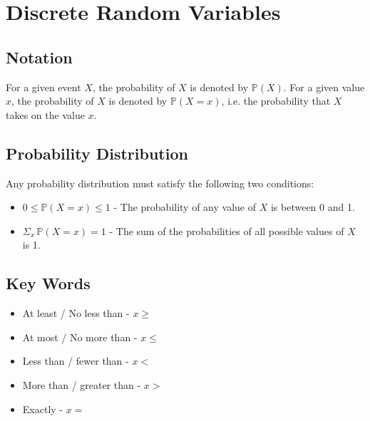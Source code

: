 \documentclass[12pt letter]{report}
\begin{document}



\section{Discrete Random Variables}

\subsection{Notation}

For a given event $X$, the probability of $X$ is denoted by $\mathbb{P} \left( X \right) $. For a given value $x$, the
probability of $X$ is denoted by $\mathbb{P} \left( X = x \right) $, i.e. the probability that $X$ takes on the value $x$.

\subsection{Probability Distribution}


Any probability distribution must satisfy the following two conditions:

\begin{itemize}
	\item $0 \leq \mathbb{P} \left( X = x  \right) \leq 1 $ - The probability of any value of $X$ is between 0 and 1.
	\item $\Sigma_x \,  \mathbb{P} \left( X = x \right) = 1 $ - The sum of the probabilities of all possible values of $X$ is 1.
\end{itemize}

\subsection{Key Words}

\begin{itemize}
	\item At least / No less than - $ x \geq$
	\item At most / No more than - $x \leq$
	\item Less than / fewer than - $ x <$
	\item  More than / greater than - $ x >$
	\item Exactly - $ x =$
\end{itemize}
\end{document}
